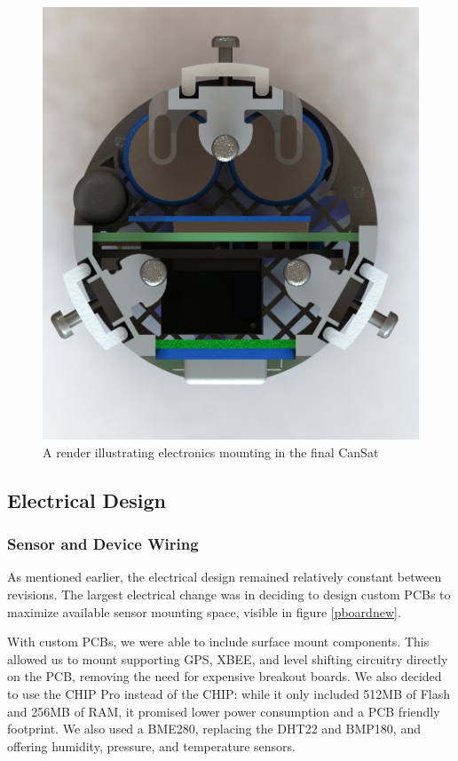 \documentclass[]{report}
\begin{document}
		\begin{figure}[h]
			\hfill\includegraphics[scale=0.5]{electronics_mount_render.jpg}\hspace*{\fill}
			\caption{A render illustrating electronics mounting in the final CanSat}
			\label{elecmount}
		\end{figure}
		
		
	\subsection{Electrical Design}
		
		\subsubsection{Sensor and Device Wiring}
		
		As mentioned earlier, the electrical design remained relatively constant between revisions. The largest electrical change was in deciding to design custom PCBs to maximize available sensor mounting space, visible in figure \ref{pboardnew}. 
		
		With custom PCBs, we were able to include surface mount components. This allowed us to mount supporting GPS, XBEE, and level shifting circuitry directly on the PCB, removing the need for expensive breakout boards. We also decided to use the CHIP Pro instead of the CHIP: while it only included 512MB of Flash and 256MB of RAM, it promised lower power consumption and a PCB friendly footprint. We also used a BME280, replacing the DHT22 and BMP180, and offering humidity, pressure, and temperature sensors.
		
\end{document}
